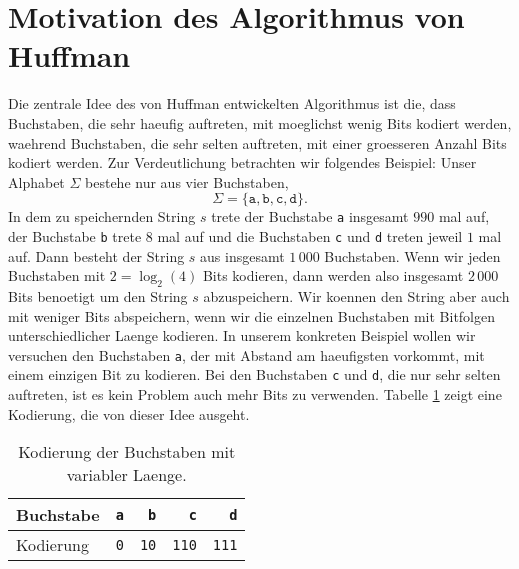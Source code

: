 \section{Motivation des Algorithmus von Huffman}
Die zentrale Idee des von Huffman entwickelten Algorithmus ist die, dass Buchstaben, die sehr
haeufig auftreten, mit moeglichst wenig Bits kodiert werden, waehrend Buchstaben, die sehr selten
auftreten, mit einer groesseren Anzahl Bits kodiert werden.  Zur Verdeutlichung betrachten
wir folgendes Beispiel:  Unser Alphabet  $\Sigma$ bestehe nur aus vier Buchstaben,
\[ \Sigma = \{ \mathtt{a}, \mathtt{b}, \mathtt{c}, \texttt{d} \}. \]
In dem zu speichernden String $s$ trete der Buchstabe \texttt{a} insgesamt $990$ mal auf, der
Buchstabe \texttt{b} trete $8$ mal auf und die Buchstaben \texttt{c} und \texttt{d} treten
jeweil $1$ mal auf.  Dann besteht der String $s$ aus insgesamt $1\,000$ 
Buchstaben.  Wenn wir jeden Buchstaben mit $2 = \log_2(4)$ Bits kodieren, dann werden also
insgesamt $2\,000$ Bits benoetigt um den String $s$ abzuspeichern.  Wir koennen den String
aber auch mit weniger Bits abspeichern, wenn wir die einzelnen Buchstaben mit Bitfolgen
unterschiedlicher Laenge kodieren.   In unserem konkreten
Beispiel wollen wir versuchen den Buchstaben \texttt{a}, der mit Abstand am haeufigsten
vorkommt, mit einem einzigen Bit zu kodieren.  Bei den  Buchstaben
\texttt{c} und \texttt{d}, die nur sehr selten auftreten, ist es kein Problem auch mehr
Bits zu verwenden.  Tabelle \ref{tab:coding} zeigt eine Kodierung, die von dieser Idee
ausgeht. 

\begin{table}[htbp]
  \centering
\begin{tabular}[t]{|l|r|r|r|r|}
\hline
Buchstabe & \texttt{a} & \texttt{b}  & \texttt{c}   & \texttt{d}   \\
\hline
Kodierung & \texttt{0} & \texttt{10} & \texttt{110} & \texttt{111} \\
\hline
\end{tabular}
  \caption{Kodierung der Buchstaben mit variabler Laenge.}
  \label{tab:coding}
\end{table}

